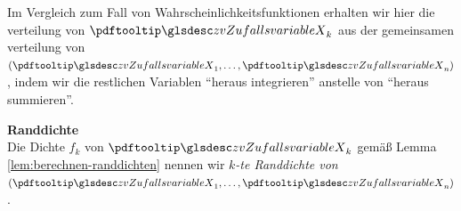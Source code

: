 Im Vergleich zum Fall von Wahrscheinlichkeitsfunktionen erhalten wir hier die \gls{verteilung} von $\zvx_k$
aus der gemeinsamen \gls{verteilung} von $(\zvx_1, \dots, \zvx_n)$, indem wir die restlichen Variablen
``heraus integrieren'' anstelle von ``heraus summieren''.

\begin{defi}
    \textbf{Randdichte}
      \\
    Die Dichte $f_k$ von $\zvx_k$ gemäß Lemma \autoref{lem:berechnen-randdichten} nennen wir \emph{$k$-te Randdichte von
        $(\zvx_1, \dots, \zvx_n)$}.
\end{defi}


\newpage
